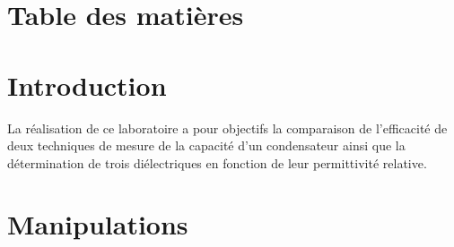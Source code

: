 \documentclass[letterpaper,12pt,oneside,final,fleqn]{book}
\begin{document}

\newcommand\prenomUn{Alice}	
\newcommand\nomUn{Breault-g}
\newcommand\matriculeUn{1836459}
\newcommand\prenomDeux{Thanina}	
\newcommand\nomDeux{Haddad}
\newcommand\matriculeDeux{1839982}
\newcommand\dateRemise{09 février 2017}
\newcommand\groupe{04}		



\newpage \section*{Table des matières}



\newpage \section*{Introduction}

La réalisation de ce laboratoire a pour objectifs la comparaison de l'efficacité de deux techniques de mesure de la capacité d'un condensateur ainsi que la détermination de trois diélectriques en fonction de leur permittivité relative.

\newpage \section*{Manipulations}
\end{document}
